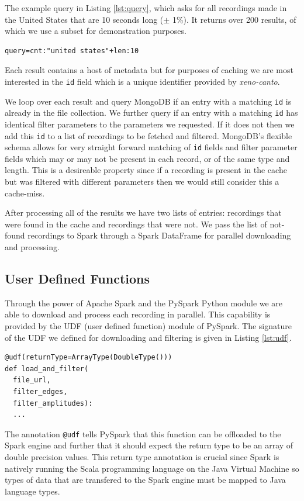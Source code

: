 \documentclass[conference,twoside]{IEEEtran}
\newcommand{\code}[1]{\texttt{#1}}
\begin{document}
The example query in Listing \ref{lst:query}, which asks for all recordings made in the United States that are 10 seconds long ($\pm$ 1\%). It returns over 200 results, of which we use a subset for demonstration purposes.
\begin{lstlisting}[language=Txt, caption={\textit{Xeno-canto} Query}, label={lst:query}]
query=cnt:"united states"+len:10
\end{lstlisting}

Each result contains a host of metadata but for purposes of caching we are most interested in the \code{id} field which is a unique identifier provided by \textit{xeno-canto}.

We loop over each result and query MongoDB if an entry with a matching \code{id} is already in the file collection. We further query if an entry with a matching \code{id} has identical filter parameters to the parameters we requested. If it does not then we add this \code{id} to a list of recordings to be fetched and filtered. MongoDB's flexible schema allows for very straight forward matching of \code{id} fields and filter parameter fields which may or may not be present in each record, or of the same type and length. This is a desireable property since if a recording is present in the cache but was filtered with different parameters then we would still consider this a cache-miss.

After processing all of the results we have two lists of entries: recordings that were found in the cache and recordings that were not. We pass the list of not-found recordings to Spark through a Spark DataFrame for parallel downloading and processing.

\subsection{User Defined Functions}
Through the power of Apache Spark and the PySpark Python module we are able to download and process each recording in parallel. This capability is provided by the UDF (user defined function) module of PySpark. The signature of the UDF we defined for downloading and filtering is given in Listing \ref{lst:udf}.
\begin{lstlisting}[language=Txt, caption={PySpark User Defined Functions}, label={lst:udf}]
@udf(returnType=ArrayType(DoubleType()))
def load_and_filter(
  file_url,
  filter_edges,
  filter_amplitudes):
  ...
\end{lstlisting}
The annotation \code{@udf} tells PySpark that this function can be offloaded to the Spark engine and further that it should expect the return type to be an array of double precision values. This return type annotation is crucial since Spark is natively running the Scala programming language on the Java Virtual Machine so types of data that are transfered to the Spark engine must be mapped to Java language types.
\end{document}
